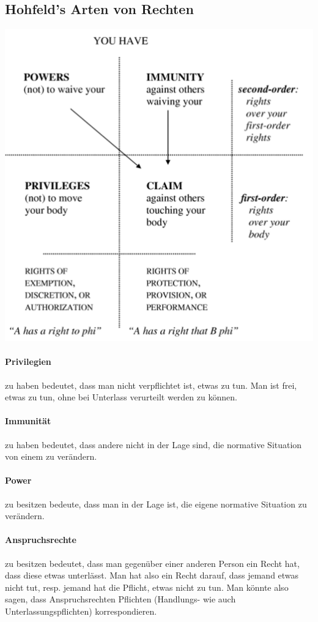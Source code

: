 \documentclass[../main.tex]{subfiles}
\begin{document}
\subsection{Hohfeld's Arten von Rechten}
\includegraphics[width=\textwidth]{images/hohfelds_rights.png}

\paragraph{Privilegien} zu haben bedeutet, dass man nicht verpflichtet ist, etwas zu tun. Man ist frei, etwas zu tun, ohne bei Unterlass verurteilt werden zu können. 
\paragraph{Immunität} zu haben bedeutet, dass andere nicht in der Lage sind, die normative Situation von einem zu verändern. 
\paragraph{Power} zu besitzen bedeute, dass man in der Lage ist, die eigene normative Situation zu verändern.
\paragraph{Anspruchsrechte} zu besitzen bedeutet, dass man gegenüber einer anderen Person ein Recht hat, dass diese etwas unterlässt. Man hat also ein Recht darauf, dass jemand etwas nicht tut, resp. jemand hat die Pflicht, etwas nicht zu tun. Man könnte also sagen, dass Anspruchsrechten Pflichten (Handlungs- wie auch Unterlassungspflichten) korrespondieren. 
\end{document}
